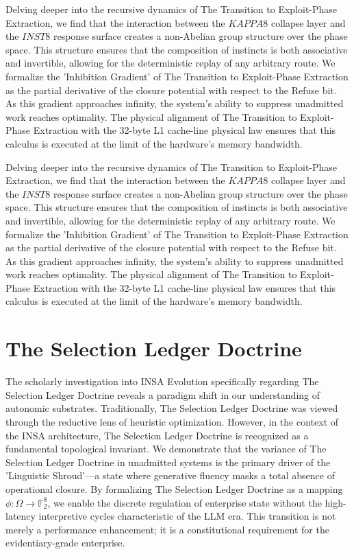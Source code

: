 \documentclass[12pt,a4paper,oneside]{book}
\begin{document}
Delving deeper into the recursive dynamics of The Transition to Exploit-Phase Extraction, we find that the interaction between the $KAPPA8$ collapse layer and the $INST8$ response surface creates a non-Abelian group structure over the phase space. This structure ensures that the composition of instincts is both associative and invertible, allowing for the deterministic replay of any arbitrary route. We formalize the 'Inhibition Gradient' of The Transition to Exploit-Phase Extraction as the partial derivative of the closure potential with respect to the Refuse bit. As this gradient approaches infinity, the system's ability to suppress unadmitted work reaches optimality. The physical alignment of The Transition to Exploit-Phase Extraction with the 32-byte L1 cache-line physical law ensures that this calculus is executed at the limit of the hardware's memory bandwidth. 

Delving deeper into the recursive dynamics of The Transition to Exploit-Phase Extraction, we find that the interaction between the $KAPPA8$ collapse layer and the $INST8$ response surface creates a non-Abelian group structure over the phase space. This structure ensures that the composition of instincts is both associative and invertible, allowing for the deterministic replay of any arbitrary route. We formalize the 'Inhibition Gradient' of The Transition to Exploit-Phase Extraction as the partial derivative of the closure potential with respect to the Refuse bit. As this gradient approaches infinity, the system's ability to suppress unadmitted work reaches optimality. The physical alignment of The Transition to Exploit-Phase Extraction with the 32-byte L1 cache-line physical law ensures that this calculus is executed at the limit of the hardware's memory bandwidth. 

\section{The Selection Ledger Doctrine}
The scholarly investigation into INSA Evolution specifically regarding The Selection Ledger Doctrine reveals a paradigm shift in our understanding of autonomic substrates. Traditionally, The Selection Ledger Doctrine was viewed through the reductive lens of heuristic optimization. However, in the context of the INSA architecture, The Selection Ledger Doctrine is recognized as a fundamental topological invariant. We demonstrate that the variance of The Selection Ledger Doctrine in unadmitted systems is the primary driver of the 'Linguistic Shroud'---a state where generative fluency masks a total absence of operational closure. By formalizing The Selection Ledger Doctrine as a mapping $\phi: \Omega \to \mathbb{F}_2^8$, we enable the discrete regulation of enterprise state without the high-latency interpretive cycles characteristic of the LLM era. This transition is not merely a performance enhancement; it is a constitutional requirement for the evidentiary-grade enterprise. 
\end{document}

